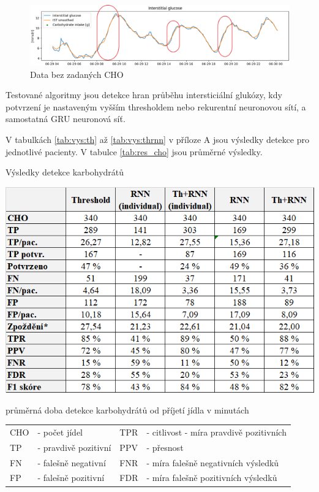 \begin{figure}[H]
\caption{Data bez zadaných CHO}
\label{fig:no_cho}
\includegraphics[width=1\textwidth]{img/vysledky/no_cho2.png}
\end{figure}

Testované algoritmy jsou detekce hran průběhu intersticiální glukózy, kdy potvrzení je nastaveným vyšším thresholdem nebo rekurentní neuronovou sítí, a samostatná GRU neuronová síť.

V tabulkách \ref{tab:vys:th} až \ref{tab:vys:thrnn} v příloze A jsou výsledky detekce pro jednotlivé pacienty. V tabulce \ref{tab:res_cho} jsou průměrné výsledky.

\begin{table}[H]
\caption{Výsledky detekce karbohydrátů}
\label{tab:res_cho}
\includegraphics[width=1\textwidth]{img/vysledky/cho/cho.png}
\end{table}
\vspace*{-7mm}

\noindent * průměrná doba detekce karbohydrátů od příjetí jídla v minutách\\
\begin{tabular}{llll}
CHO & - počet jídel & TPR & - citlivost - míra pravdivě pozitivních\\
TP & - pravdivě pozitivní & PPV & - přesnost\\
FN & - falešně negativní & FNR & - míra falešně negativních výsledků \\
FP & - falešně pozitivní&FDR & - míra falešně pozitivních výsledků\\
\end{tabular}\\

